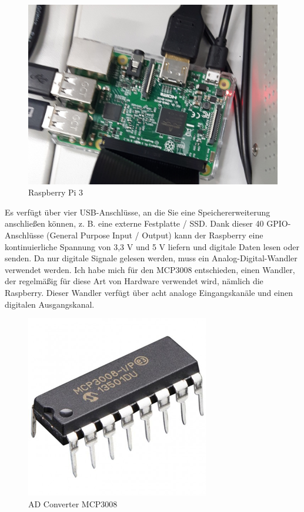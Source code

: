 \documentclass[12pt,a4paper]{scrartcl}
\numberwithin{equation}{section}
\begin{document}
\begin{figure}[ht!]
	\centering
	  \includegraphics[scale=0.15]{raspberry.jpg}
	  \caption{Raspberry Pi 3}
\end{figure}

Es verfügt über vier USB-Anschlüsse, an die Sie eine Speichererweiterung anschließen können, z. B. eine externe Festplatte / SSD. Dank dieser 40 GPIO-Anschlüsse (General Purpose Input / Output) kann der Raspberry eine kontinuierliche Spannung von 3,3 V und 5 V liefern und digitale Daten lesen oder senden. Da nur digitale Signale gelesen werden, muss ein Analog-Digital-Wandler verwendet werden. Ich habe mich für den MCP3008 entschieden, einen Wandler, der regelmäßig für diese Art von Hardware verwendet wird, nämlich die Raspberry. Dieser Wandler verfügt über acht analoge Eingangskanäle und einen digitalen Ausgangskanal. 

\begin{figure}[ht!]
	\centering
	  \includegraphics[scale=0.5]{converter.png}
	  \caption[AD Converter MCP3008]{AD Converter MCP3008\footnotemark}
\end{figure}
\end{document}
